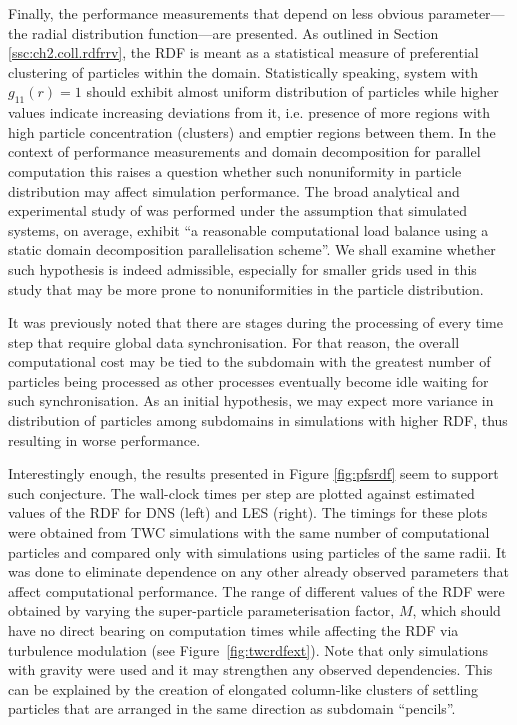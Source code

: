 \documentclass{pracamgren}
\begin{document}
Finally, the performance measurements that depend on less obvious parameter---the radial distribution function---are presented.
As outlined in Section \ref{ssc:ch2.coll.rdfrrv}, the RDF is meant as a statistical measure of preferential clustering of particles within the domain.
Statistically speaking, system with $g_{11}(r) = 1$ should exhibit almost uniform distribution of particles while higher values indicate increasing deviations from it, i.e. presence of more regions with high particle concentration (clusters) and emptier regions between them.
In the context of performance measurements and domain decomposition for parallel computation this raises a question whether such nonuniformity in particle distribution may affect simulation performance.
The broad analytical and experimental study of \textcite{Ayala2014} was performed under the assumption that simulated systems, on average, exhibit ``a reasonable computational load balance using a static domain decomposition parallelisation scheme''.
We shall examine whether such hypothesis is indeed admissible, especially for smaller grids used in this study that may be more prone to nonuniformities in the particle distribution.

It was previously noted that there are stages during the processing of every time step that require global data synchronisation.
For that reason, the overall computational cost may be tied to the subdomain with the greatest number of particles being processed as other processes eventually become idle waiting for such synchronisation.
As an initial hypothesis, we may expect more variance in distribution of particles among subdomains in simulations with higher RDF, thus resulting in worse performance.

Interestingly enough, the results presented in Figure \ref{fig:pfsrdf} seem to support such conjecture.
The wall-clock times per step are plotted against estimated values of the RDF for DNS (left) and LES (right).
The timings for these plots were obtained from TWC simulations with the same number of computational particles and compared only with simulations using particles of the same radii.
It was done to eliminate dependence on any other already observed parameters that affect computational performance.
The range of different values of the RDF were obtained by varying the super-particle parameterisation factor, $M$, which should have no direct bearing on computation times while affecting the RDF via turbulence modulation (see Figure~\ref{fig:twcrdfext}). 
Note that only simulations with gravity were used and it may strengthen any observed dependencies.
This can be explained by the creation of elongated column-like clusters of settling particles that are arranged in the same direction as subdomain ``pencils''.
\end{document}
